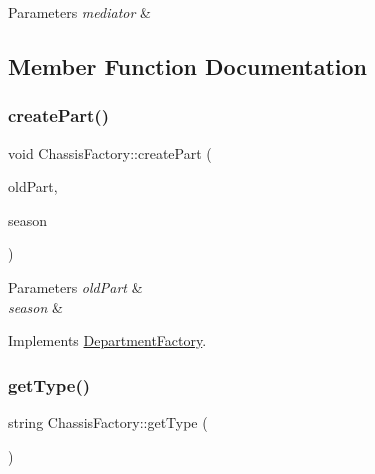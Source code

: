 \begin{DoxyParams}{Parameters}
{\em mediator} & \\
\hline
\end{DoxyParams}


\subsection{Member Function Documentation}
\mbox{\label{classChassisFactory_aeeb7d210e8c3ca1a3e3b2998705b0d90}} 
\subsubsection{\texorpdfstring{create\+Part()}{createPart()}}
{\footnotesize\ttfamily void Chassis\+Factory\+::create\+Part (\begin{DoxyParamCaption}\item[{\hyperlink{classDepartmentOutput}{Department\+Output} $\ast$}]{old\+Part,  }\item[{string}]{season }\end{DoxyParamCaption})\hspace{0.3cm}{\ttfamily [virtual]}}


\begin{DoxyParams}{Parameters}
{\em old\+Part} & \\
\hline
{\em season} & \\
\hline
\end{DoxyParams}


Implements \hyperlink{classDepartmentFactory_a6080a560efb9fe0b9c870db5a7358886}{Department\+Factory}.

\mbox{\label{classChassisFactory_af038789501da489aeccb19520dc09686}} 
\subsubsection{\texorpdfstring{get\+Type()}{getType()}}
{\footnotesize\ttfamily string Chassis\+Factory\+::get\+Type (\begin{DoxyParamCaption}{ }\end{DoxyParamCaption})\hspace{0.3cm}{\ttfamily [virtual]}}


